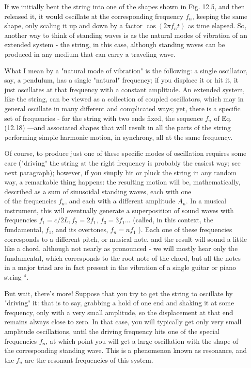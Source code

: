 \documentclass[10pt]{article}
\begin{document}
If we initially bent the string into one of the shapes shown in Fig. 12.5, and then released it, it would oscillate at the corresponding frequency $f_{n}$, keeping the same shape, only scaling it up and down by a factor $\cos \left(2 \pi f_{n} t\right)$ as time elapsed. So, another way to think of standing waves is as the natural modes of vibration of an extended system - the string, in this case, although standing waves can be produced in any medium that can carry a traveling wave.

What I mean by a "natural mode of vibration" is the following: a single oscillator, say, a pendulum, has a single "natural" frequency; if you displace it or hit it, it just oscillates at that frequency with a constant amplitude. An extended system, like the string, can be viewed as a collection of coupled oscillators, which may in general oscillate in many different and complicated ways; yet, there is a specific set of frequencies - for the string with two ends fixed, the sequence $f_{n}$ of Eq. (12.18) —and associated shapes that will result in all the parts of the string performing simple harmonic motion, in synchrony, all at the same frequency.

Of course, to produce just one of these specific modes of oscillation requires some care ("driving" the string at the right frequency is probably the easiest way; see next paragraph); however, if you simply hit or pluck the string in any random way, a remarkable thing happens: the resulting motion will be, mathematically, described as a sum of sinusoidal standing waves, each with one\\
of the frequencies $f_{n}$, and each with a different amplitude $A_{n}$. In a musical instrument, this will eventually generate a superposition of sound waves with frequencies $f_{1}=c / 2 L, f_{2}=2 f_{1}$, $f_{3}=3 f_{1} \ldots$ (called, in this context, the fundamental, $f_{1}$, and its overtones, $f_{n}=n f_{1}$ ). Each one of these frequencies corresponds to a different pitch, or musical note, and the result will sound a little like a chord, although not nearly as pronounced - we will mostly hear only the fundamental, which corresponds to the root note of the chord, but all the notes in a major triad are in fact present in the vibration of a single guitar or piano string ${ }^{4}$.

But wait, there's more! Suppose that you try to get the string to oscillate by "driving" it: that is to say, grabbing a hold of one end and shaking it at some frequency, only with a very small amplitude, so the displacement at that end remains always close to zero. In that case, you will typically get only very small amplitude oscillations, until the driving frequency hits one of the special frequencies $f_{n}$, at which point you will get a large oscillation with the shape of the corresponding standing wave. This is a phenomenon known as resonance, and the $f_{n}$ are the resonant frequencies of this system.
\end{document}
